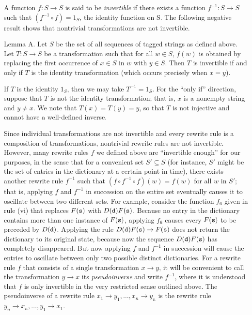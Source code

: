 A function $f : S\to S$ is said to be {\it invertible} if there exists a function $f^{-1}:S\to S$ such that
$(f^{-1}\circ f) = 1_S$, the identity function on S. The following negative result
shows that nontrivial transformations are not invertible.

\proclaim Lemma A. Let $S$ be the set of all sequences of tagged strings as defined above. Let $T: S\to S$
be a transformation such that for all $w\in S$, $f(w)$ is obtained by
replacing the first occurrence of $x\in S$ in $w$ with $y\in S$. Then
$T$ is invertible if and only if $T$ is the identity transformation (which occurs precisely when $x=y$).

\proof If $T$ is the identity $1_S$, then we may take $T^{-1} = 1_S$. For the ``only if'' direction, suppose
that $T$ is not the identity transformation; that is, $x$ is a nonempty string and $y\neq x$. We note that
$T(x) = T(y) = y$, so that $T$ is not injective and cannot have a well-defined inverse.\slug

Since individual transformations are not invertible and every rewrite rule is a composition of transformations,
nontrivial rewrite rules are not invertible. However, many rewrite rules $f$ we defined above are ``invertible
enough'' for our purposes, in the sense that for a convenient set $S'\subseteq S$ (for instance,
$S'$ might be the set of entries in the dictionary at a certain point in time),
there exists another rewrite rule $f^{-1}$ such that
$(f\circ f^{-1} \circ f)(w) = f(w)$ for all $w$ in $S'$; that is, applying $f$ and $f^{-1}$ in succession
on the entire set eventually causes it to oscillate between two different sets. For example, consider the
function $f_6$ given in rule (vi) that replaces $F({\tt s})$ with $D({\tt d})F({\tt s})$. Because no entry in the dictionary
contains more than one instance of $F({\tt s})$, applying $f_6$ causes every $F({\tt s})$ to be preceded by $D({\tt d})$.
Applying the rule $D({\tt d})F({\tt s})\to F({\tt s})$ does not return the dictionary to its original state, because now the
sequence $D({\tt d})F({\tt s})$ has completely disappeared. But now applying $f$ and $f^{-1}$ in succession will
cause the entries to oscillate between only two possible distinct dictionaries.
For a rewrite rule $f$ that consists of a single transformation $x\to y$, it will
be convenient to call the transformation $y\to x$ its {\it pseudoinverse} and write $f^{-1}$, where it is understood
that $f$ is only invertible in the very restricted sense outlined above. The pseudoinverse of a rewrite rule
$x_1\to y_1,\ldots, x_n\to y_n$ is the rewrite rule $y_n\to x_n, \ldots, y_1\to x_1$.

